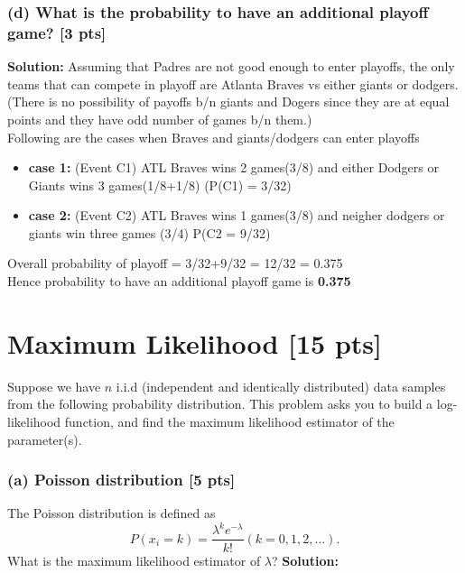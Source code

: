 \documentclass[twoside,10pt]{article}
\begin{document}
\subsubsection*{(d) What is the probability to have an additional playoff game? [3 pts]}
\textbf{ Solution: }	
Assuming that Padres are not good enough to enter playoffs, the only teams that can compete in playoff are Atlanta Braves vs either giants or dodgers. \\(There is no possibility of payoffs b/n giants and Dogers since they are at equal points and they have odd number of games b/n them.)\\
Following are the cases when Braves and giants/dodgers can enter playoffs
\begin{itemize}
\item \textbf{case 1:} (Event C1) ATL Braves wins 2 games(3/8) and either Dodgers or Giants wins 3 games(1/8+1/8) (P(C1) = 3/32)
\item \textbf{case 2:} (Event C2) ATL Braves wins 1 games(3/8) and neigher dodgers or giants win three games (3/4) P(C2 = 9/32)
\end{itemize}
Overall probability of playoff = 3/32+9/32 = 12/32 = 0.375\\
Hence probability to have an additional playoff game is \textbf{0.375}
\newpage

\section{Maximum Likelihood [15 pts]}

Suppose we have $n$ i.i.d (independent and identically distributed)
data samples from the following probability distribution. This
problem asks you to build a log-likelihood function, and find the
maximum likelihood estimator of the parameter(s).

\subsubsection*{(a) Poisson distribution [5 pts]}
The Poisson distribution is defined as
\begin{equation} \nonumber
P(x_i = k) = \frac{\lambda^k e^{-\lambda}}{k!} (k = 0, 1, 2, ...).
\end{equation}
What is the maximum likelihood estimator of $\lambda$?
\textbf{Solution:}
\end{document}
